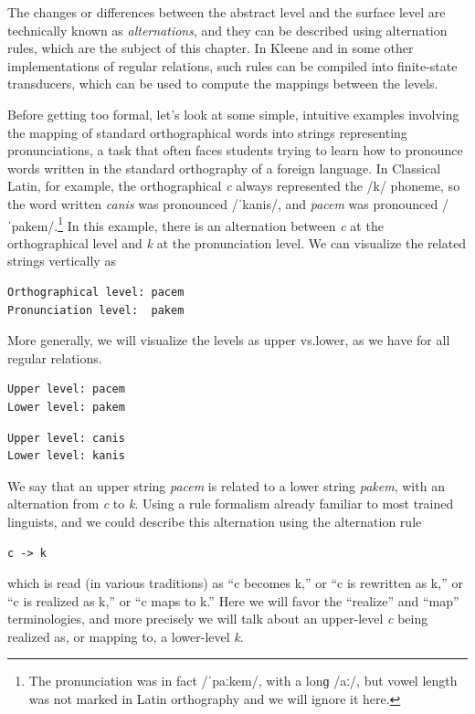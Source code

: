 \noindent
The changes or differences between the abstract level and the surface level are
technically known as \emph{alternations}, and they can be described using alternation rules, which are the
subject of this chapter.  In
Kleene and in some other implementations of regular relations, 
such rules can be compiled into finite-state transducers, which can be
used to compute the mappings between the levels.

Before getting too formal, let's look at some simple, intuitive examples involving the
mapping of standard
orthographical words into strings representing pronunciations, a task that often faces students trying
to learn how to pronounce words written in the standard orthography of a foreign language.  In Classical
Latin, for example, the orthographical \emph{c} always represented
the /k/ phoneme, so the word written \emph{canis} was
pronounced /ˈkanis/, and \emph{pacem} was pronounced
/ˈpakem/.\footnote{The pronunciation was in fact /ˈpaːkem/, with a lonɡ
/aː/, but vowel length was not marked in Latin orthography and we will
ignore it here.} In this example,
there is an alternation between \emph{c} at the orthographical level and
\emph{k} at the pronunciation level.  We can visualize the related strings vertically as

\begin{Verbatim}
Orthographical level: pacem
Pronunciation level:  pakem
\end{Verbatim}

\noindent
More generally, we will visualize the levels as upper vs.\@ lower, as we have for all regular
relations.

\begin{Verbatim}
Upper level: pacem
Lower level: pakem
\end{Verbatim}

\begin{Verbatim}
Upper level: canis
Lower level: kanis
\end{Verbatim}

\noindent
We say that an upper string \emph{pacem} is related to a lower string
\emph{pakem}, with an alternation from \emph{c} to \emph{k}.
Using a rule formalism already familiar to most trained linguists, and we could describe this alternation
using the alternation rule

\begin{Verbatim}
c -> k
\end{Verbatim}

\noindent
which is read (in various traditions) as ``c becomes k,'' or ``c is rewritten as k,'' or ``c is realized
as k,'' or ``c
maps to k.''  Here we will favor the ``realize'' and ``map'' terminologies, and more precisely we will
talk about an upper-level \emph{c} being realized as, or mapping to, a lower-level \emph{k}.

